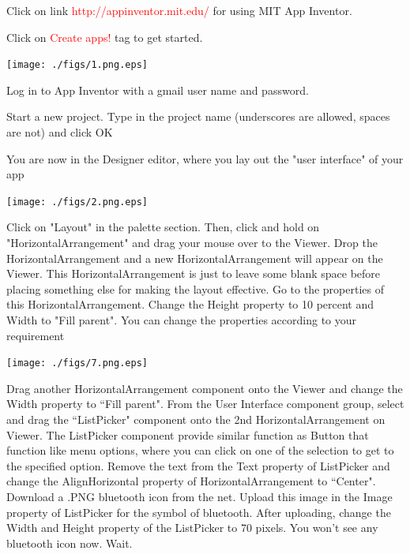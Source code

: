 \documentclass[journal,12pt,twocolumn]{IEEEtran}
\begin{document}
%
\begin{problem}
Click on link \textcolor{red}{http://appinventor.mit.edu/} for using MIT App Inventor.
\end{problem}
%
\begin{problem}
Click on \textcolor{red}{Create apps!} tag to get started.
\end{problem}
%
\texttt{[image: ./figs/1.png.eps]}
\begin{problem}
Log in to App Inventor with a gmail user name and password.
\end{problem}
%
\begin{problem}
Start a new project. Type in the project name (underscores are allowed, spaces are not) and click OK
\end{problem}
%
\begin{problem}
You are now in the Designer editor, where you lay out the "user interface" of your app
\end{problem}
%
\texttt{[image: ./figs/2.png.eps]}
\begin{problem}
Click on "Layout" in the palette section. Then, click and hold on "HorizontalArrangement" and drag your mouse over to the Viewer. Drop the HorizontalArrangement and a new HorizontalArrangement will appear on the Viewer. This HorizontalArrangement is just to leave some blank space before placing something else for making the layout effective. Go to the properties of this HorizontalArrangement. Change the Height property to 10 percent and Width to "Fill parent". You can change the properties according to your requirement
\end{problem}
%
\texttt{[image: ./figs/7.png.eps]}
\begin{problem}
Drag another HorizontalArrangement component onto the Viewer and change the Width property to ``Fill parent". From the User Interface component group, select and drag the ``ListPicker" component onto the 2nd HorizontalArrangement on Viewer. The ListPicker component provide similar function as Button that function like menu options, where you can click on one of the selection to get to the specified option.  Remove the text from the Text property of ListPicker and change the  AlignHorizontal property of HorizontalArrangement to ``Center". Download a .PNG bluetooth icon from the net.  Upload this image in the Image property of ListPicker for the symbol of bluetooth.  After uploading, change the Width and Height property of the ListPicker to 70 pixels. You won't see any bluetooth icon now.  Wait.
\end{problem}
\end{document}
